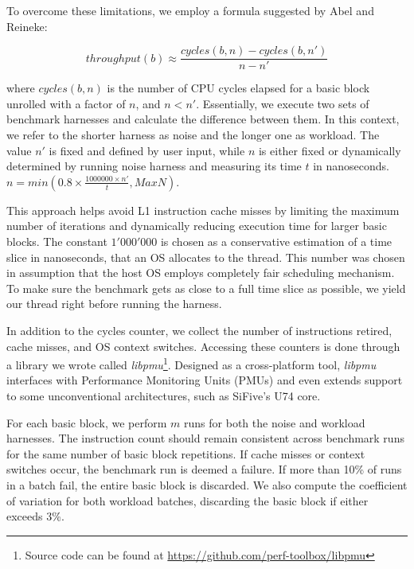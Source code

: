 To overcome these limitations, we employ a formula suggested by Abel and Reineke\cite{abelUiCAAccurateThroughput2022}:

\begin{equation}
throughput(b) \approx \frac{cycles(b, n) - cycles(b, n')}{n - n'}
  \label{eq:throughput}
\end{equation}

where $cycles(b, n)$ is the number of CPU cycles elapsed for a basic block unrolled with a factor of $n$, and $n < n'$. Essentially, we execute two sets of benchmark harnesses and calculate the difference between them. In this context, we refer to the shorter harness as noise and the longer one as workload. The value $n'$ is fixed and defined by user input, while $n$ is either fixed or dynamically determined by running noise harness and measuring its time $t$ in nanoseconds.
$n = min(0.8 \times \frac{1000000 \times n'}{t}, MaxN)$.

This approach helps avoid L1 instruction cache misses by limiting the maximum number of iterations and 
dynamically reducing execution time for larger basic blocks. The constant $1'000'000$ is chosen as a 
conservative estimation of a time slice in nanoseconds, that an OS allocates to the thread. This number 
was chosen in assumption that the host OS employs completely fair scheduling mechanism. To make sure the 
benchmark gets as close to a full time slice as possible, we yield our thread right before running the 
harness.

In addition to the cycles counter, we collect the number of instructions retired, cache misses, and OS 
context switches. Accessing these counters is done through a library we wrote called 
\textit{libpmu}\footnote{Source code can be found at \url{https://github.com/perf-toolbox/libpmu}}. 
Designed as a cross-platform tool, \textit{libpmu} interfaces with Performance Monitoring Units (PMUs) 
and even extends support to some unconventional architectures, such as SiFive's U74 core.

For each basic block, we perform $m$ runs for both the noise and workload harnesses. The instruction 
count should remain consistent across benchmark runs for the same number of basic block repetitions. 
If cache misses or context switches occur, the benchmark run is deemed a failure. If more than 10\% of 
runs in a batch fail, the entire basic block is discarded. We also compute the coefficient of variation 
for both workload batches, discarding the basic block if either exceeds 3\%.

